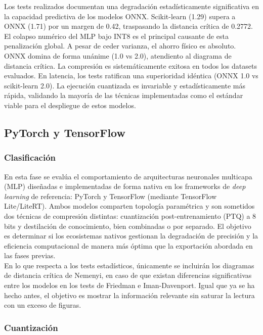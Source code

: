 \documentclass[a4paper,12pt,twoside,final]{book}
\begin{document}
Los tests realizados documentan una degradación estadísticamente significativa en la capacidad predictiva de los modelos
ONNX. Scikit-learn (1.29) supera a ONNX (1.71) por un margen de 0.42, traspasando la distancia crítica de 0.2772. El
colapso numérico del MLP bajo INT8 es el principal causante de esta penalización global. A pesar de ceder varianza, el
ahorro físico es absoluto. ONNX domina de forma unánime (1.0 vs 2.0), atendiento al diagrama de distancia crítica. La
compresión es sistemáticamente exitosa en todos los datasets evaluados. En latencia, los tests ratifican una superioridad
idéntica (ONNX 1.0 vs scikit-learn 2.0). La ejecución cuantizada es invariable y estadísticamente más rápida, validando
la mayoría de las técnicas implementadas como el estándar viable para el despliegue de estos modelos.

\subsection{PyTorch y TensorFlow}
\subsubsection{Clasificación}
En esta fase se evalúa el comportamiento de arquitecturas neuronales multicapa (MLP) diseñadas e implementadas de forma
nativa en los frameworks de \textit{deep learning} de referencia: PyTorch y TensorFlow (mediante TensorFlow Lite/LiteRT).
Ambos modelos comparten topología paramétrica y son sometidos dos técnicas de compresión distintas: cuantización
post-entrenamiento (PTQ) a 8 bits y destilación de conocimiento, bien combinadas o por separado. El objetivo es determinar
si los ecosistemas nativos gestionan la degradación de precisión y la eficiencia computacional de manera más óptima que la
exportación abordada en las fases previas.\\

En lo que respecta a los tests estadísticos, únicamente se incluirán los diagramas de distancia crítica de Nemenyi, en
caso de que existan diferencias significativas entre los modelos en los tests de Friedman e Iman-Davenport. Igual que ya
se ha hecho antes, el objetivo es mostrar la información relevante sin saturar la lectura con un exceso de figuras.

\subsubsection{Cuantización}
\end{document}
